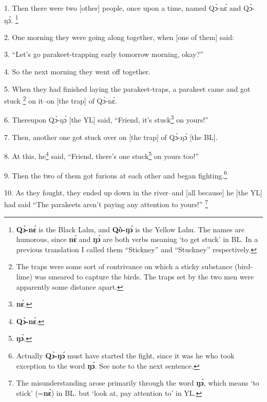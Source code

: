 \setcounter{footnote}{0}

1. Then there were two [other] people, once upon a time, named Qɔ̀-nɛ́ and Qɔ̀-ŋɔ́.
\footnote{\textbf{Qɔ̀-nɛ́} is the Black Lahu, and \textbf{Qò-ŋɔ́} is the Yellow Lahu. The names are humorous, since \textbf{nɛ́} and \textbf{ŋɔ́} are both verbs meaning `to get stuck' in BL. In a previous translation I called them ``Stickney'' and ``Stuckney'' respectively.}

2. One morning they were going along together, when [one of them] said:

3. ``Let's go parakeet-trapping early tomorrow morning, okay?''

4. So the next morning they went off together.

5. When they had finished laying the parakeet-traps, a parakeet came and got stuck
\footnote{The traps were some sort of contrivance on which a sticky substance (bird-lime) was smeared to capture the birds. The traps set by the two men were apparently some distance apart.} on it--on [the trap] of Qɔ̀-nɛ́.

6. Thereupon Qɔ̀-ŋɔ́ [the YL] said, ``Friend, it's stuck\footnote{\textbf{nɛ́}.} on yours!''

7. Then, another one got stuck over on [the trap] of Qɔ̀-ŋɔ́ [the BL].

8. At this, he\footnote{\textbf{Qɔ̀-nɛ́}.} said, ``Friend, there's one stuck\footnote{\textbf{ŋɔ́}.} on yours too!''

9. Then the two of them got furious at each other and began fighting.\footnote{Actually \textbf{Qɔ̀-ŋɔ́} must have started the fight, since it was he who took exception to the word \textbf{ŋɔ́}. See note to the next sentence.}

10. As they fought, they ended up down in the river--and [all because] he [the YL]
had said ``The parakeets aren't paying any attention to yours!''
\footnote{The misunderstanding arose primarily through the word \textbf{ŋɔ́}, which means `to stick' (=\textbf{nɛ́}) in BL. but `look at, pay attention to' in YL.}

